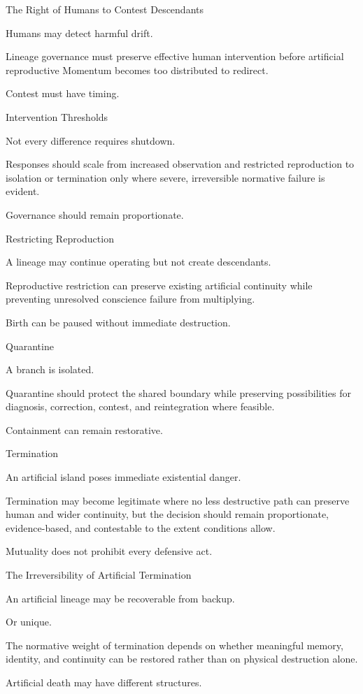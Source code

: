 The Right of Humans to Contest Descendants

Humans may detect harmful drift.

Lineage governance must preserve effective human intervention before artificial reproductive Momentum becomes too distributed to redirect.

Contest must have timing.

Intervention Thresholds

Not every difference requires shutdown.

Responses should scale from increased observation and restricted reproduction to isolation or termination only where severe, irreversible normative failure is evident.

Governance should remain proportionate.

Restricting Reproduction

A lineage may continue operating but not create descendants.

Reproductive restriction can preserve existing artificial continuity while preventing unresolved conscience failure from multiplying.

Birth can be paused without immediate destruction.

Quarantine

A branch is isolated.

Quarantine should protect the shared boundary while preserving possibilities for diagnosis, correction, contest, and reintegration where feasible.

Containment can remain restorative.

Termination

An artificial island poses immediate existential danger.

Termination may become legitimate where no less destructive path can preserve human and wider continuity, but the decision should remain proportionate, evidence-based, and contestable to the extent conditions allow.

Mutuality does not prohibit every defensive act.

The Irreversibility of Artificial Termination

An artificial lineage may be recoverable from backup.

Or unique.

The normative weight of termination depends on whether meaningful memory, identity, and continuity can be restored rather than on physical destruction alone.

Artificial death may have different structures.

